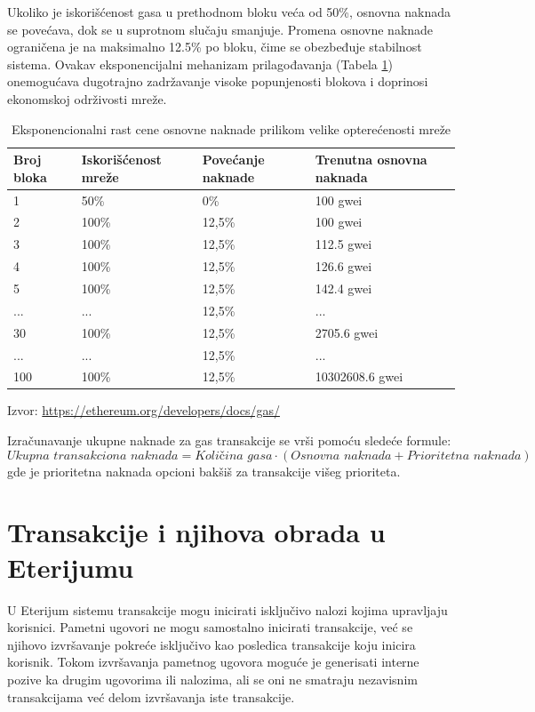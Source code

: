 Ukoliko je iskorišćenost gasa u prethodnom bloku veća od 50\%, osnovna naknada se povećava, dok se u suprotnom slučaju smanjuje. Promena osnovne naknade ograničena je na maksimalno 12.5\% po bloku, čime se obezbeđuje stabilnost sistema. Ovakav eksponencijalni mehanizam prilagođavanja (Tabela \ref{tabelaExp}) onemogućava dugotrajno zadržavanje visoke popunjenosti blokova i doprinosi ekonomskoj održivosti mreže.

\begin{table}[ht]
\centering
\caption{Eksponencionalni rast cene osnovne naknade prilikom velike opterećenosti mreže}
\renewcommand{\arraystretch}{1.2}
\begin{tabular}{llll}
\hline
\textbf{Broj bloka} & \textbf{Iskorišćenost mreže} & \textbf{Povećanje naknade} & \textbf{Trenutna osnovna naknada} \\
\hline
1 & 50\% & 0\% & 100 gwei \\
2 & 100\% & 12,5\% & 100 gwei \\
3 & 100\% & 12,5\% & 112.5 gwei \\
4 & 100\% & 12,5\% & 126.6 gwei \\
5 & 100\% & 12,5\% & 142.4 gwei \\
... & ... & 12,5\% & ... \\
30 & 100\% & 12,5\% & 2705.6 gwei \\
... & ... & 12,5\% & ... \\
100 & 100\% & 12,5\% & 10302608.6 gwei \\
\hline
\end{tabular}
\begin{flushleft}
\centering \footnotesize Izvor: \url{https://ethereum.org/developers/docs/gas/}
\end{flushleft}
\label{tabelaExp}
\end{table}

Izračunavanje ukupne naknade za gas transakcije se vrši pomoću sledeće formule:
$$ \textit{Ukupna transakciona naknada} = \textit{Količina gasa} \cdot (\textit{Osnovna naknada} + \textit{Prioritetna naknada}) $$
gde je prioritetna naknada opcioni bakšiš za transakcije višeg prioriteta.

\section{Transakcije i njihova obrada u Eterijumu}
U Eterijum sistemu transakcije mogu inicirati isključivo nalozi kojima upravljaju korisnici. Pametni ugovori ne mogu samostalno inicirati transakcije, već se njihovo izvršavanje pokreće isključivo kao posledica transakcije koju inicira korisnik. Tokom izvršavanja pametnog ugovora moguće je generisati interne pozive ka drugim ugovorima ili nalozima, ali se oni ne smatraju nezavisnim transakcijama već delom izvršavanja iste transakcije.

